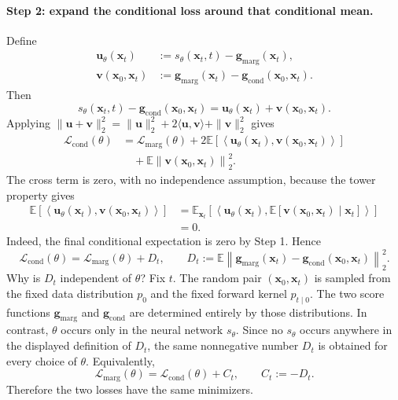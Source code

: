 \documentclass[11pt,a4paper]{article}
\theoremstyle{definition}
\begin{document}
\paragraph{Step 2: expand the conditional loss around that conditional mean.}
Define
\[
\begin{aligned}
\mathbf{u}_\theta(\mathbf{x}_t)
&:=
s_\theta(\mathbf{x}_t,t)
-\mathbf{g}_{\mathrm{marg}}(\mathbf{x}_t),\\
\mathbf{v}(\mathbf{x}_0,\mathbf{x}_t)
&:=
\mathbf{g}_{\mathrm{marg}}(\mathbf{x}_t)
-\mathbf{g}_{\mathrm{cond}}(\mathbf{x}_0,\mathbf{x}_t).
\end{aligned}
\]
Then
\[
s_\theta(\mathbf{x}_t,t)
-\mathbf{g}_{\mathrm{cond}}(\mathbf{x}_0,\mathbf{x}_t)
=\mathbf{u}_\theta(\mathbf{x}_t)
+\mathbf{v}(\mathbf{x}_0,\mathbf{x}_t).
\]
Applying $\|\mathbf{u}+\mathbf{v}\|_2^2
=\|\mathbf{u}\|_2^2
+2\langle\mathbf{u},\mathbf{v}\rangle
+\|\mathbf{v}\|_2^2$ gives
\[
\begin{aligned}
\mathcal{L}_{\mathrm{cond}}(\theta)
&=
\mathcal{L}_{\mathrm{marg}}(\theta)
+2\mathbb{E}\!\left[
\left\langle
\mathbf{u}_\theta(\mathbf{x}_t),
\mathbf{v}(\mathbf{x}_0,\mathbf{x}_t)
\right\rangle
\right]\\
&\quad+
\mathbb{E}\left\|
\mathbf{v}(\mathbf{x}_0,\mathbf{x}_t)
\right\|_2^2.
\end{aligned}
\]
The cross term is zero, with no independence assumption, because the tower property gives
\[
\begin{aligned}
\mathbb{E}\!\left[
\left\langle
\mathbf{u}_\theta(\mathbf{x}_t),
\mathbf{v}(\mathbf{x}_0,\mathbf{x}_t)
\right\rangle
\right]
&=
\mathbb{E}_{\mathbf{x}_t}\!\left[
\left\langle
\mathbf{u}_\theta(\mathbf{x}_t),
\mathbb{E}\!\left[
\mathbf{v}(\mathbf{x}_0,\mathbf{x}_t)
\mid\mathbf{x}_t
\right]
\right\rangle
\right]\\
&=0.
\end{aligned}
\]
Indeed, the final conditional expectation is zero by Step 1. Hence
\[
\mathcal{L}_{\mathrm{cond}}(\theta)
=
\mathcal{L}_{\mathrm{marg}}(\theta)
+D_t,
\qquad
D_t:=
\mathbb{E}\left\|
\mathbf{g}_{\mathrm{marg}}(\mathbf{x}_t)
-\mathbf{g}_{\mathrm{cond}}(\mathbf{x}_0,\mathbf{x}_t)
\right\|_2^2.
\]
Why is $D_t$ independent of $\theta$? Fix $t$. The random pair
$(\mathbf{x}_0,\mathbf{x}_t)$ is sampled from the fixed data distribution $p_0$ and the
fixed forward kernel $p_{t\mid0}$. The two score functions
$\mathbf{g}_{\mathrm{marg}}$ and $\mathbf{g}_{\mathrm{cond}}$ are determined entirely by
those distributions. In contrast, $\theta$ occurs only in the neural network
$s_\theta$. Since no $s_\theta$ occurs anywhere in the displayed definition of $D_t$, the
same nonnegative number $D_t$ is obtained for every choice of $\theta$. Equivalently,
\[
\mathcal{L}_{\mathrm{marg}}(\theta)
=
\mathcal{L}_{\mathrm{cond}}(\theta)+C_t,
\qquad
C_t:=-D_t.
\]
Therefore the two losses have the same minimizers.
\end{document}
